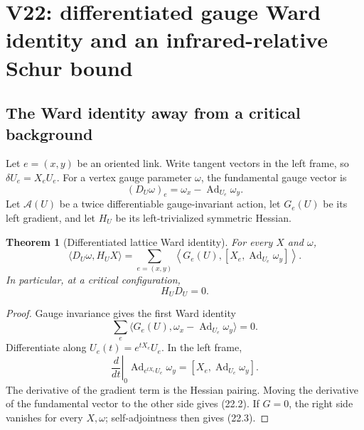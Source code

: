 \documentclass[11pt,oneside]{book}
\newtheorem{theorem}{Theorem}[chapter]
\theoremstyle{definition}
\theoremstyle{remark}
\begin{document}


\section{V22: differentiated gauge Ward identity and an infrared-relative
Schur bound}
\label{sec:e8v22}

\subsection{The Ward identity away from a critical background}

Let \(e=(x,y)\) be an oriented link.  Write tangent vectors in the
left frame, so \(\delta U_e=X_eU_e\).  For a vertex gauge parameter
\(\omega\), the fundamental gauge vector is
\[
 (D_U\omega)_e=\omega_x-\operatorname{Ad}_{U_e}\omega_y.           \tag{22.1}
\]
Let \(\mathcal A(U)\) be a twice differentiable gauge-invariant action,
let \(G_e(U)\) be its left gradient, and let \(H_U\) be its
left-trivialized symmetric Hessian.

\begin{theorem}[Differentiated lattice Ward identity]
\label{thm:e8v22-differentiated-Ward}
For every \(X\) and \(\omega\),
\[
\boxed{\quad
\langle D_U\omega,H_UX\rangle
=\sum_{e=(x,y)}
\left\langle G_e(U),
[X_e,\operatorname{Ad}_{U_e}\omega_y]\right\rangle .
\quad}                                                            \tag{22.2}
\]
In particular, at a critical configuration,
\[
                         H_UD_U=0.                                \tag{22.3}
\]
\end{theorem}

\begin{proof}
Gauge invariance gives the first Ward identity
\[
\sum_e\langle G_e(U),
\omega_x-\operatorname{Ad}_{U_e}\omega_y\rangle=0.                 \tag{22.4}
\]
Differentiate along \(U_e(t)=e^{tX_e}U_e\).  In the left frame,
\[
\left.\frac d{dt}\right|_{0}
\operatorname{Ad}_{e^{tX_e}U_e}\omega_y
=[X_e,\operatorname{Ad}_{U_e}\omega_y].
\]
The derivative of the gradient term is the Hessian pairing.  Moving
the derivative of the fundamental vector to the other side gives
(22.2).  If \(G=0\), the right side vanishes for every \(X,\omega\);
self-adjointness then gives (22.3).
\end{proof}
\end{document}
